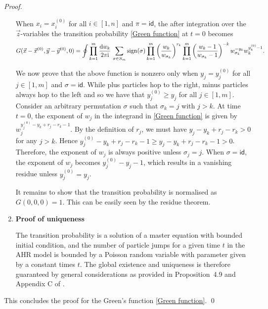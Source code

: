 \documentclass[cmp]{svjour}
\numberwithin{theorem}{section}
\numberwithin{equation}{section}
\def\dd{{\rm d}}
\def\ii{{\rm i}}
\DeclareMathOperator{\sign}{sign}
\begin{document}
\begin{proof}
\begin{enumerate}[label=(\roman*)]
When $x_i=x_i^{(0)}$ for all $i \in  [1,n]$ and $\pi=\textsf{id}$, the after integration over the $\vec{z}$-variables the transition probability \eqref{Green function} at $t=0$ becomes
\begin{equation*}
G(\vec{x}-\vec{x}^{(0)},\vec{y}-\vec{y}^{(0)},0)
=
\oint
\prod_{k=1}^m \frac{\dd w_k }{2\pi \ii}\,
\sum_{\sigma\in S_m} \sign(\sigma)
\prod_{k=1}^{m}\left(\frac{w_k}{w_{\sigma_k}}\right)^{r_k}
\prod_{k=1}^m  \left( \frac{w_k-1}{w_{\sigma_k}-1}\right)^{-k}  w_{\sigma_k}^{-y_k} w_{k}^{y^{(0)}_k-1}.
\end{equation*}

\medskip

We now prove that the above function is nonzero only when $y_j=y_j^{(0)}$ for all $j\in [1,m]$ and $\sigma=\textsf{id}$. While plus particles hop to the right, minus particles always hop to the left and so we have that $y_j^{(0)}\geq y_j$ for all $j \in [1, m]$.  Consider an arbitrary permutation $\sigma$ such that $\sigma_k=j$ with $j>k$. At time $t=0$, the exponent of $w_j$ in the integrand in \eqref{Green function} is given by $w_j^{y_j^{(0)}-y_k+r_j-r_k-1}$. By the definition of $r_j$, we must have $y_j-y_k+r_j-r_k>0$ for any $j>k$. Hence $y_j^{(0)}-y_k+r_j-r_k-1\geq y_j-y_k+r_j-r_k-1>0$. Therefore, the exponent of $w_j$ is always positive unless $\sigma_j=j$. When $\sigma=\textsf{id}$, the exponent of $w_j$ becomes $y_j^{(0)}-y_j-1$, which results in a vanishing residue unless $y_j^{(0)}= y_j$.

It remains to show that the transition probability is normalised as $G(0,0,0)=1$. This can be easily seen by the residue theorem.

\medskip

\item\textbf{Proof of uniqueness}

The transition probability is a solution of a master equation with bounded initial condition, and the number of particle jumps for a given time $t$ in the AHR model is bounded by a Poisson random variable with parameter given by a constant times $t$. The global existence and uniqueness is therefore guaranteed by general considerations as provided in Proposition~4.9 and Appendix C of \cite{bcs}.
\end{enumerate}
This concludes the proof for the Green's function \eqref{Green function}.
\qed
\end{proof}
\end{document}
